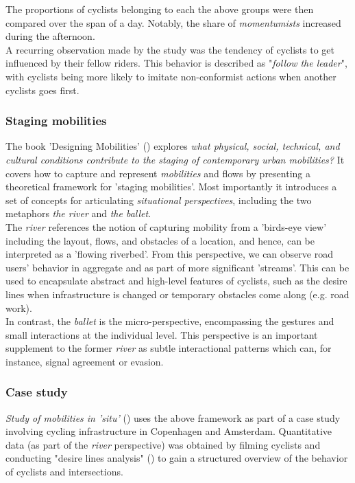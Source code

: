 The proportions of cyclists belonging to each the above groups were then compared over the span of a day. 
Notably, the share of \textit{momentumists} increased during the afternoon.
 \ \\

A recurring observation made by the study was the tendency of cyclists to get influenced by their fellow riders. 
This behavior is described as "\textit{follow the leader}", with cyclists being more likely to imitate non-conformist 
actions when another cyclists goes first. 

\subsubsection{Staging mobilities}
The book 'Designing Mobilities' (\cite{designinig_mobilities}) explores \textit{what physical, social, technical, 
and cultural conditions contribute to the staging of contemporary urban mobilities?} 
It covers how to capture and represent \textit{mobilities} and flows by presenting a theoretical framework for 'staging mobilities'. 
Most importantly it introduces a set of concepts for articulating \textit{situational perspectives}, 
including the two metaphors \textit{the river} and \textit{the ballet}. 
 \ \\

 The \textit{river} references the notion of capturing mobility from a 'birds-eye view' including the layout, 
 flows, and obstacles of a location, and hence, can be interpreted as a 'flowing riverbed'. 
 From this perspective, we can observe road users' behavior in aggregate and as part of more significant 'streams'. 
 This can be used to encapsulate abstract and high-level features of cyclists, such as the desire lines
 when infrastructure is changed or temporary obstacles come along (e.g. road work).
 \ \\

In contrast, the \textit{ballet} is the micro-perspective, encompassing the gestures and small interactions at the individual level.
This perspective is an important supplement to the former \textit{river} as subtle interactional patterns which can, for instance,
 signal agreement or evasion.

\subsubsection{Case study}
\textit{Study of mobilities in 'situ'} (\cite{situ}) uses the above framework as part of a case study involving cycling infrastructure in 
Copenhagen and Amsterdam. Quantitative data (as part of the \textit{river} perspective) was obtained by filming cyclists and conducting 
"desire lines analysis" (\cite{cva}) to gain a structured overview of the behavior of cyclists and intersections. 


